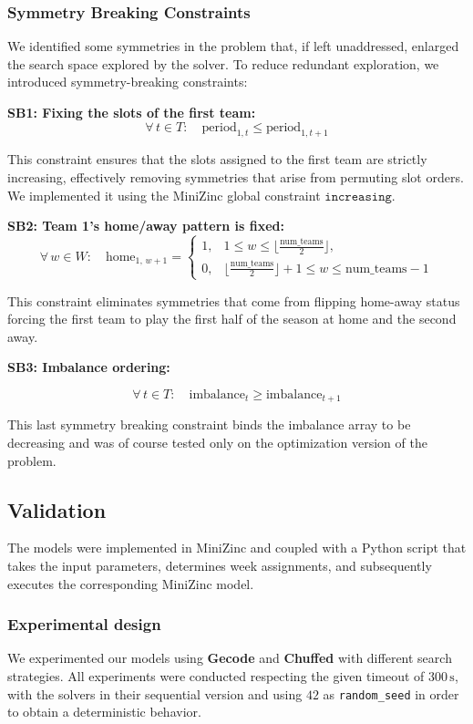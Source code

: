 \documentclass{article}
\begin{document}
\subsubsection*{Symmetry Breaking Constraints}
We identified some symmetries in the problem that, if left unaddressed,  enlarged the search space explored by the solver. To reduce redundant exploration, we introduced symmetry-breaking constraints:

\textbf{SB1: Fixing the slots of the first team:}
\[
\forall\, t \in T:\quad \text{period}_{1,t} \le \text{period}_{1,t+1}
\]

This constraint ensures that the slots assigned to the first team are strictly increasing, effectively removing symmetries that arise from permuting slot orders. We implemented it using the MiniZinc global constraint $\mathtt{increasing}.$

\textbf{SB2: Team 1's home/away pattern is fixed:}
\[
\forall\, w \in W:\quad
\text{home}_{1,\, w+1} =
\begin{cases}
1, & 1 \le w \le \lfloor \tfrac{\text{num\_teams}}{2} \rfloor,\\[2mm]
0, & \lfloor \tfrac{\text{num\_teams}}{2} \rfloor + 1 \le w \le \text{num\_teams}-1
\end{cases}
\]

This constraint eliminates symmetries that come from flipping home-away status forcing the first team to play the first half of the season at home and the second away.

\textbf{SB3: Imbalance ordering:}  

\[
\forall\, t \in T:\quad \text{imbalance}_t \ge \text{imbalance}_{t+1}
\]

This last symmetry breaking constraint binds the imbalance array to be decreasing and was of course tested only on the optimization version of the problem.

\subsection{Validation}
The models were implemented in MiniZinc and coupled with a Python script that takes the input parameters, determines week assignments, and subsequently executes the corresponding MiniZinc model.

\subsubsection{Experimental design}
We experimented our models using \textbf{Gecode} and \textbf{Chuffed} with different search strategies. All experiments were conducted respecting the given timeout of $300\,\mathrm{s}$, with the solvers in their sequential version and using $42$ as \texttt{random\_seed} in order to obtain a deterministic behavior.
\end{document}
